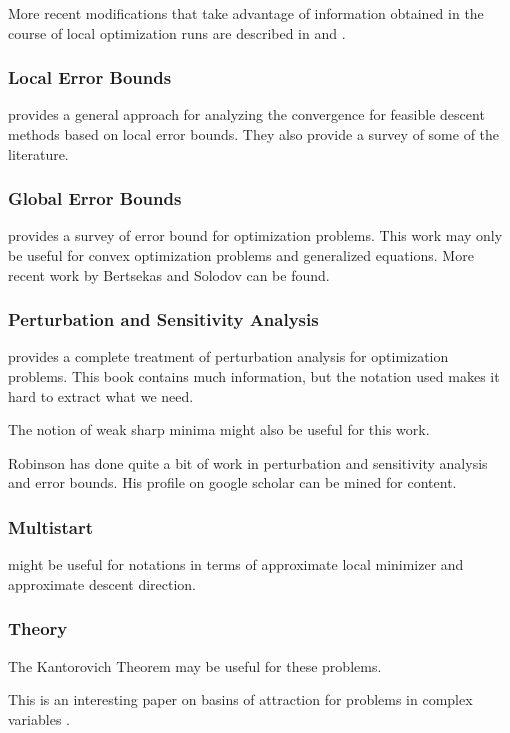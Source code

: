 More recent modifications that take advantage of information obtained in the 
course of local optimization runs are described in \cite{WildPhD} and 
\cite{LarWild14}.

\subsubsection{Local Error Bounds}

\cite{LuoTseng:Error} provides a general approach for analyzing the convergence
for feasible descent methods based on local error bounds.  They also provide
a survey of some of the literature.

\subsubsection{Global Error Bounds}

\cite{Pang:Error} provides a survey of error bound for optimization problems.
This work may only be useful for convex optimization problems and generalized
equations.  More recent work by Bertsekas and Solodov can be found.

\subsubsection{Perturbation and Sensitivity Analysis}

\cite{BonnansShapiro} provides a complete treatment of perturbation analysis
for optimization problems.  This book contains much information, but the
notation used makes it hard to extract what we need.

The notion of weak sharp minima \cite{BurkeFerris:Weak} might also be useful
for this work.

Robinson has done quite a bit of work in perturbation and sensitivity
analysis and error bounds.  His profile on google scholar can be
mined for content.

\subsubsection{Multistart}
\cite{fernandes2012derivative} might be useful for notations in terms of approximate local minimizer and approximate descent direction.

\subsubsection{Theory}

The Kantorovich Theorem may be useful for these problems.

This is an interesting paper on basins of attraction for problems
in complex variables \cite{EpureanuGreenside:Fractal}.

